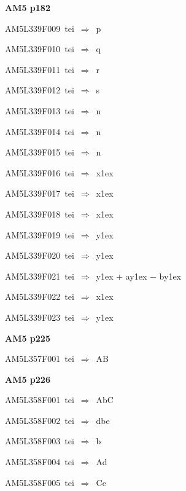 \par\vfill\eject
{\bf\hfill AM5 p182\hfill\hbox{}}\par\bigskip
{\sixrm AM5L339F009\ {\sixit tei}\ }$\Rightarrow$\ {\tenit p}\par\smallskip
{\sixrm AM5L339F010\ {\sixit tei}\ }$\Rightarrow$\ {\tenit q}\par\smallskip
{\sixrm AM5L339F011\ {\sixit tei}\ }$\Rightarrow$\ {\tenit r}\par\smallskip
{\sixrm AM5L339F012\ {\sixit tei}\ }$\Rightarrow$\ {\tenit s}\par\smallskip
{\sixrm AM5L339F013\ {\sixit tei}\ }$\Rightarrow$\ {\tenit n}\par\smallskip
{\sixrm AM5L339F014\ {\sixit tei}\ }$\Rightarrow$\ {\tenit n}\par\smallskip
{\sixrm AM5L339F015\ {\sixit tei}\ }$\Rightarrow$\ {\tenit n}\par\smallskip
{\sixrm AM5L339F016\ {\sixit tei}\ }$\Rightarrow$\ {\tenit x}\raise1ex\hbox{}\par\smallskip
{\sixrm AM5L339F017\ {\sixit tei}\ }$\Rightarrow$\ {\tenit x}\raise1ex\hbox{}\par\smallskip
{\sixrm AM5L339F018\ {\sixit tei}\ }$\Rightarrow$\ {\tenit x}\raise1ex\hbox{}\par\smallskip
{\sixrm AM5L339F019\ {\sixit tei}\ }$\Rightarrow$\ {\tenit y}\raise1ex\hbox{}\par\smallskip
{\sixrm AM5L339F020\ {\sixit tei}\ }$\Rightarrow$\ {\tenit y}\raise1ex\hbox{}\par\smallskip
{\sixrm AM5L339F021\ {\sixit tei}\ }$\Rightarrow$\ {\tenit y}\raise1ex\hbox{} + {\tenit ay}\raise1ex\hbox{} − {\tenit by}\raise1ex\hbox{}\par\smallskip
{\sixrm AM5L339F022\ {\sixit tei}\ }$\Rightarrow$\ {\tenit x}\raise1ex\hbox{}\par\smallskip
{\sixrm AM5L339F023\ {\sixit tei}\ }$\Rightarrow$\ {\tenit y}\raise1ex\hbox{}\par\smallskip

\par\vfill\eject
{\bf\hfill AM5 p225\hfill\hbox{}}\par\bigskip
{\sixrm AM5L357F001\ {\sixit tei}\ }$\Rightarrow$\ AB\par\smallskip

\par\vfill\eject
{\bf\hfill AM5 p226\hfill\hbox{}}\par\bigskip
{\sixrm AM5L358F001\ {\sixit tei}\ }$\Rightarrow$\ A{\tenit b}C\par\smallskip
{\sixrm AM5L358F002\ {\sixit tei}\ }$\Rightarrow$\ {\tenit dbe}\par\smallskip
{\sixrm AM5L358F003\ {\sixit tei}\ }$\Rightarrow$\ {\tenit b}\par\smallskip
{\sixrm AM5L358F004\ {\sixit tei}\ }$\Rightarrow$\ A{\tenit d}\par\smallskip
{\sixrm AM5L358F005\ {\sixit tei}\ }$\Rightarrow$\ C{\tenit e}\par\smallskip

